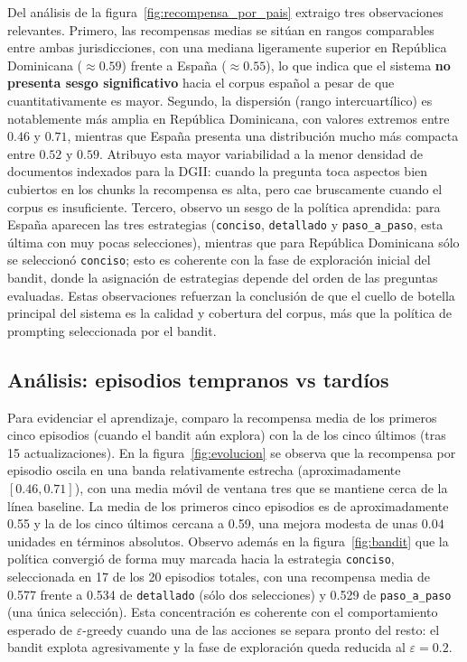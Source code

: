 \documentclass[11pt,a4paper]{article}
\begin{document}
Del análisis de la figura~\ref{fig:recompensa_por_pais} extraigo tres observaciones relevantes. Primero, las recompensas medias se sitúan en rangos comparables entre ambas jurisdicciones, con una mediana ligeramente superior en República Dominicana ($\approx 0.59$) frente a España ($\approx 0.55$), lo que indica que el sistema \textbf{no presenta sesgo significativo} hacia el corpus español a pesar de que cuantitativamente es mayor. Segundo, la dispersión (rango intercuartílico) es notablemente más amplia en República Dominicana, con valores extremos entre $0.46$ y $0.71$, mientras que España presenta una distribución mucho más compacta entre $0.52$ y $0.59$. Atribuyo esta mayor variabilidad a la menor densidad de documentos indexados para la DGII: cuando la pregunta toca aspectos bien cubiertos en los chunks la recompensa es alta, pero cae bruscamente cuando el corpus es insuficiente. Tercero, observo un sesgo de la política aprendida: para España aparecen las tres estrategias (\texttt{conciso}, \texttt{detallado} y \texttt{paso\_a\_paso}, esta última con muy pocas selecciones), mientras que para República Dominicana sólo se seleccionó \texttt{conciso}; esto es coherente con la fase de exploración inicial del bandit, donde la asignación de estrategias depende del orden de las preguntas evaluadas. Estas observaciones refuerzan la conclusión de que el cuello de botella principal del sistema es la calidad y cobertura del corpus, más que la política de prompting seleccionada por el bandit.

\subsection{Análisis: episodios tempranos vs tardíos}

Para evidenciar el aprendizaje, comparo la recompensa media de los primeros cinco episodios (cuando el bandit aún explora) con la de los cinco últimos (tras 15 actualizaciones). En la figura~\ref{fig:evolucion} se observa que la recompensa por episodio oscila en una banda relativamente estrecha (aproximadamente $[0.46, 0.71]$), con una media móvil de ventana tres que se mantiene cerca de la línea baseline. La media de los primeros cinco episodios es de aproximadamente 0.55 y la de los cinco últimos cercana a 0.59, una mejora modesta de unas $0.04$ unidades en términos absolutos. Observo además en la figura~\ref{fig:bandit} que la política convergió de forma muy marcada hacia la estrategia \texttt{conciso}, seleccionada en 17 de los 20 episodios totales, con una recompensa media de 0.577 frente a 0.534 de \texttt{detallado} (sólo dos selecciones) y 0.529 de \texttt{paso\_a\_paso} (una única selección). Esta concentración es coherente con el comportamiento esperado de $\varepsilon$-greedy cuando una de las acciones se separa pronto del resto: el bandit explota agresivamente y la fase de exploración queda reducida al $\varepsilon = 0.2$.
\end{document}
